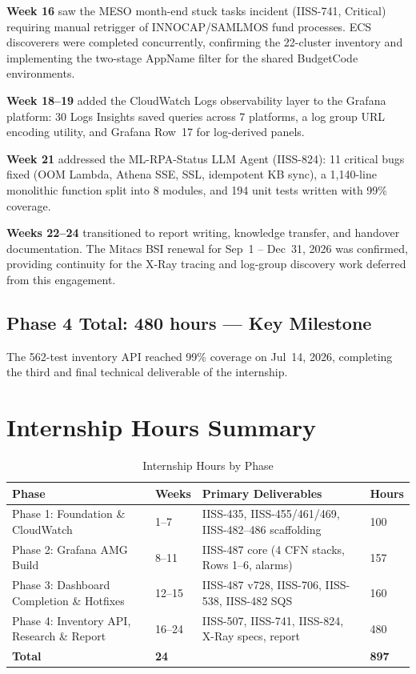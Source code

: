 \textbf{Week 16} saw the MESO month-end stuck tasks incident (IISS-741,
Critical) requiring manual retrigger of INNOCAP/SAMLMOS fund processes. ECS
discoverers were completed concurrently, confirming the 22-cluster inventory
and implementing the two-stage AppName filter for the shared BudgetCode environments.

\textbf{Week 18--19} added the CloudWatch Logs observability layer to the
Grafana platform: 30 Logs Insights saved queries across 7 platforms, a
log group URL encoding utility, and Grafana Row~17 for log-derived panels.

\textbf{Week 21} addressed the ML-RPA-Status LLM Agent (IISS-824):
11 critical bugs fixed (OOM Lambda, Athena SSE, SSL, idempotent KB sync),
a 1,140-line monolithic function split into 8 modules, and 194 unit tests
written with 99\% coverage.

\textbf{Weeks 22--24} transitioned to report writing, knowledge transfer,
and handover documentation. The Mitacs BSI renewal for
Sep~1 -- Dec~31, 2026 was confirmed, providing continuity for
the X-Ray tracing and log-group discovery work deferred from this engagement.

\subsection{Phase 4 Total: 480 hours --- Key Milestone}

The 562-test inventory API reached 99\% coverage on Jul~14, 2026, completing
the third and final technical deliverable of the internship.

\section{Internship Hours Summary}
\label{sec:wb_hours}

\begin{table}[ht]
\centering
\caption{Internship Hours by Phase}
\label{tab:wb_hours}
\begin{tabular}{p{5.0cm}p{1.2cm}p{5.5cm}p{1.5cm}}
\toprule
\textbf{Phase} & \textbf{Weeks} & \textbf{Primary Deliverables} & \textbf{Hours} \\
\midrule
Phase 1: Foundation \& CloudWatch & 1--7 & IISS-435, IISS-455/461/469, IISS-482--486 scaffolding & 100 \\
Phase 2: Grafana AMG Build & 8--11 & IISS-487 core (4 CFN stacks, Rows 1--6, alarms) & 157 \\
Phase 3: Dashboard Completion \& Hotfixes & 12--15 & IISS-487 v728, IISS-706, IISS-538, IISS-482 SQS & 160 \\
Phase 4: Inventory API, Research \& Report & 16--24 & IISS-507, IISS-741, IISS-824, X-Ray specs, report & 480 \\
\midrule
\textbf{Total} & \textbf{24} & & \textbf{897} \\
\bottomrule
\end{tabular}
\end{table}

